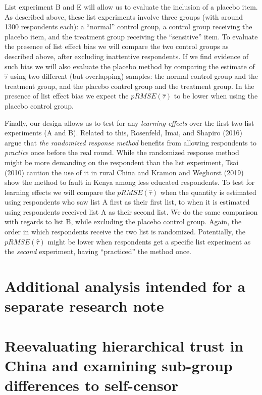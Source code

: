 \documentclass[]{article}
\begin{document}
List experiment B and E will allow us to evaluate the inclusion of a
placebo item. As described above, these list experiments involve three
groups (with around 1300 respondents each): a ``normal'' control group,
a control group receiving the placebo item, and the treatment group
receiving the ``sensitive'' item. To evaluate the presence of list
effect bias we will compare the two control groups as described above,
after excluding inattentive respondents. If we find evidence of such
bias we will also evaluate the placebo method by comparing the estimate
of \(\hat{\tau}\) using two different (but overlapping) samples: the
normal control group and the treatment group, and the placebo control
group and the treatment group. In the presence of list effect bias we
expect the \(pRMSE(\hat{\tau})\) to be lower when using the placebo
control group.

Finally, our design allows us to test for any \emph{learning effects}
over the first two list experiments (A and B). Related to this,
Rosenfeld, Imai, and Shapiro (2016) argue that \emph{the randomized
response method} benefits from allowing respondents to \emph{practice}
once before the real round. While the randomized response method might
be more demanding on the respondent than the list experiment, Tsai
(2010) caution the use of it in rural China and Kramon and Weghorst
(2019) show the method to fault in Kenya among less educated
respondents. To test for learning effects we will compare the
\(pRMSE(\hat{\tau})\) when the quantity is estimated using respondents
who saw list A first as their first list, to when it is estimated using
respondents received list A as their second list. We do the same
comparison with regards to list B, while excluding the placebo control
group. Again, the order in which respondents receive the two list is
randomized. Potentially, the \(pRMSE(\hat{\tau})\) might be lower when
respondents get a specific list experiment as the \emph{second}
experiment, having ``practiced'' the method once.

\newpage

\hypertarget{additional-analysis-intended-for-a-separate-research-note}{%
\section{Additional analysis intended for a separate research
note}\label{additional-analysis-intended-for-a-separate-research-note}}

\hypertarget{reevaluating-hierarchical-trust-in-china-and-examining-sub-group-differences-to-self-censor}{%
\section{Reevaluating hierarchical trust in China and examining
sub-group differences to
self-censor}\label{reevaluating-hierarchical-trust-in-china-and-examining-sub-group-differences-to-self-censor}}
\end{document}
